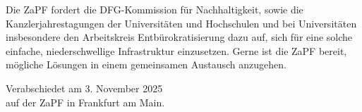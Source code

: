 \documentclass[DIV=calc]{scrartcl}
\begin{document}
Die ZaPF fordert die DFG-Kommission für Nachhaltigkeit, sowie die Kanzlerjahrestagungen der Universitäten und Hochschulen und bei Universitäten insbesondere den Arbeitskreis Entbürokratisierung dazu auf, sich für eine solche einfache, niederschwellige Infrastruktur einzusetzen. Gerne ist die ZaPF bereit, mögliche Lösungen in einem gemeinsamen Austausch anzugehen.


%
\vfill
\begin{flushright}
	Verabschiedet am 3. November 2025 \\
	auf der ZaPF in Frankfurt am Main.
\end{flushright}
\end{document}
